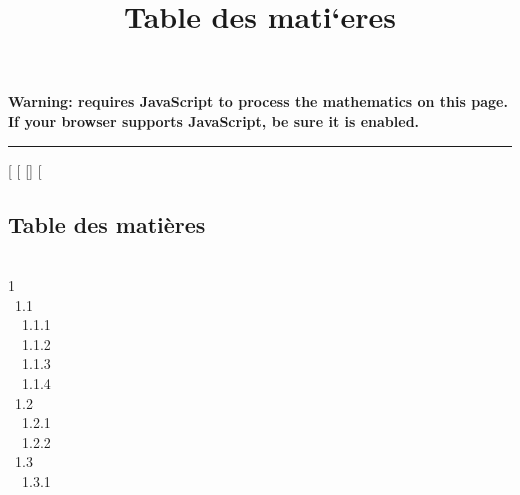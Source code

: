 \documentclass[]{article}
\title{Table des mati`eres}
\author{}
\date{}
\begin{document}
\maketitle

\textbf{Warning: 
requires JavaScript to process the mathematics on this page.\\ If your
browser supports JavaScript, be sure it is enabled.}

\begin{center}\rule{3in}{0.4pt}\end{center}

{[}
{[}
{[}{]}
{[}

\subsection{Table des matières}

 \\ 1
 \\ ~1.1
 \\ ~~1.1.1
 \\ ~~1.1.2
 \\ ~~1.1.3
 \\ ~~1.1.4
 \\ ~1.2
 \\
~~1.2.1  \\
~~1.2.2  \\
~1.3  \\ ~~1.3.1
\end{document}
